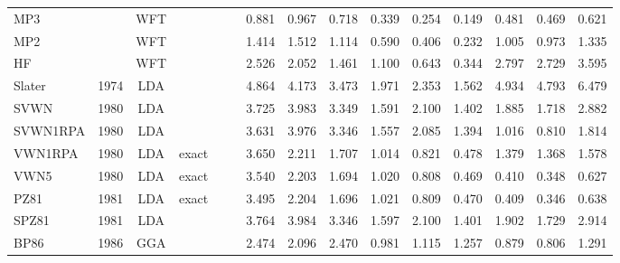 \begin{landscape}
\begin{longtable}{lcccccrrrrrrrrr}
    MP3              &      & WFT  &          &             &           & 0.881             & 0.967             & 0.718  & 0.339              & 0.254             & 0.149  & 0.481   & 0.469 & 0.621 \\
    MP2              &      & WFT  &          &             &           & 1.414             & 1.512             & 1.114  & 0.590              & 0.406             & 0.232  & 1.005   & 0.973 & 1.335 \\
    HF               &      & WFT  &          &             &           & 2.526             & 2.052             & 1.461  & 1.100              & 0.643             & 0.344  & 2.797   & 2.729 & 3.595 \\
    Slater           & 1974 & LDA  &          &             &           & 4.864             & 4.173             & 3.473  & 1.971              & 2.353             & 1.562  & 4.934   & 4.793 & 6.479 \\
    SVWN             & 1980 & LDA  &          &             &           & 3.725             & 3.983             & 3.349  & 1.591              & 2.100             & 1.402  & 1.885   & 1.718 & 2.882 \\
    SVWN1RPA         & 1980 & LDA  &          &             &           & 3.631             & 3.976             & 3.346  & 1.557              & 2.085             & 1.394  & 1.016   & 0.810 & 1.814 \\
    VWN1RPA          & 1980 & LDA  & exact    &             &           & 3.650             & 2.211             & 1.707  & 1.014              & 0.821             & 0.478  & 1.379   & 1.368 & 1.578 \\
    VWN5             & 1980 & LDA  & exact    &             &           & 3.540             & 2.203             & 1.694  & 1.020              & 0.808             & 0.469  & 0.410   & 0.348 & 0.627 \\
    PZ81             & 1981 & LDA  & exact    &             &           & 3.495             & 2.204             & 1.696  & 1.021              & 0.809             & 0.470  & 0.409   & 0.346 & 0.638 \\
    SPZ81            & 1981 & LDA  &          &             &           & 3.764             & 3.984             & 3.346  & 1.597              & 2.100             & 1.401  & 1.902   & 1.729 & 2.914 \\
    BP86             & 1986 & GGA  &          &             &           & 2.474             & 2.096             & 2.470  & 0.981              & 1.115             & 1.257  & 0.879   & 0.806 & 1.291 \\

\end{longtable}
\end{landscape}
